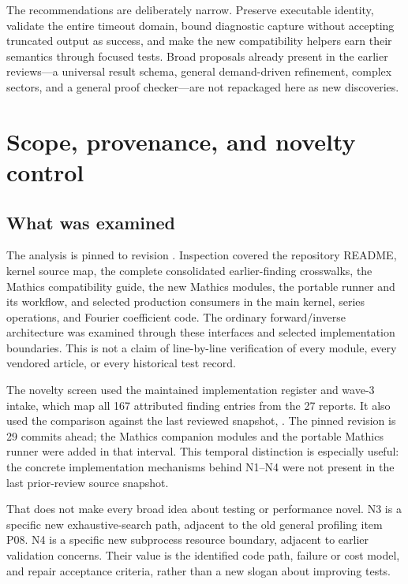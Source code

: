 \documentclass[11pt,letterpaper]{article}
\newcommand{\code}[1]{\texttt{\detokenize{#1}}}
\begin{document}
The recommendations are deliberately narrow. Preserve executable identity, validate the entire timeout domain, bound diagnostic capture without accepting truncated output as success, and make the new compatibility helpers earn their semantics through focused tests. Broad proposals already present in the earlier reviews---a universal result schema, general demand-driven refinement, complex sectors, and a general proof checker---are not repackaged here as new discoveries.

\section{Scope, provenance, and novelty control}
\label{sec:scope}

\subsection{What was examined}

The analysis is pinned to revision \code{513917b}. Inspection covered the repository README, kernel source map, the complete consolidated earlier-finding crosswalks, the Mathics compatibility guide, the new Mathics modules, the portable runner and its workflow, and selected production consumers in the main kernel, series operations, and Fourier coefficient code. The ordinary forward/inverse architecture was examined through these interfaces and selected implementation boundaries. This is not a claim of line-by-line verification of every module, every vendored article, or every historical test record.~\cite{readme,kernelmap,status,wave3,mathicsguide}

The novelty screen used the maintained implementation register and wave-3 intake, which map all 167 attributed finding entries from the 27 reports. It also used the comparison against the last reviewed snapshot, \code{6687962}. The pinned revision is 29 commits ahead; the Mathics companion modules and the portable Mathics runner were added in that interval. This temporal distinction is especially useful: the concrete implementation mechanisms behind N1--N4 were not present in the last prior-review source snapshot.~\cite{reviews,status,wave3,comparison}

That does not make every broad idea about testing or performance novel. N3 is a specific new exhaustive-search path, adjacent to the old general profiling item P08. N4 is a specific new subprocess resource boundary, adjacent to earlier validation concerns. Their value is the identified code path, failure or cost model, and repair acceptance criteria, rather than a new slogan about improving tests.
\end{document}
